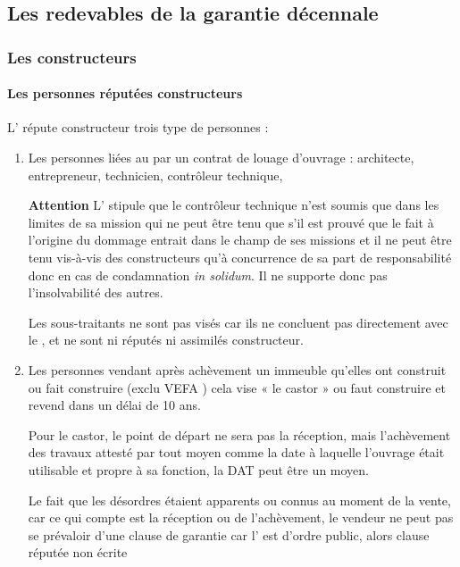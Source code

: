 	\subsection{Les redevables de la garantie décennale}

		\subsubsection{Les constructeurs}

			\paragraph{Les personnes réputées constructeurs}

			L' répute constructeur trois type de personnes :
			\begin{enumerate}
				\item Les personnes liées au \MO par un contrat de louage d’ouvrage : architecte, entrepreneur, technicien, contrôleur technique, \etc

				\textbf{Attention} L' stipule que le contrôleur technique n'est soumis que dans les limites de sa mission \CAD qui ne peut être tenu que s’il est prouvé que le fait à l’origine du dommage entrait dans le champ de ses missions et il ne peut être tenu vis-à-vis des constructeurs qu’à concurrence de sa part de responsabilité donc en cas de condamnation \emph{in solidum}. Il ne supporte donc pas l’insolvabilité des autres.

				Les sous-traitants ne sont pas visés car ils ne concluent pas directement avec le \MO, et ne sont ni réputés ni assimilés constructeur.

				\item Les personnes vendant après achèvement un immeuble qu’elles ont construit ou fait construire (exclu VEFA \aValider) cela vise « le castor » ou faut construire et revend dans un délai de 10 ans.

				Pour le castor, le point de départ ne sera pas la réception, mais l’achèvement des travaux attesté par tout moyen comme la date à laquelle l’ouvrage était utilisable et propre à sa fonction, la DAT peut être un moyen.

				Le fait que les désordres étaient apparents ou connus au moment de la vente, car ce qui compte est la réception ou de l’achèvement, le vendeur ne peut pas se prévaloir d’une clause de garantie car l' est d’ordre public, alors clause réputée non écrite


\end{enumerate}
